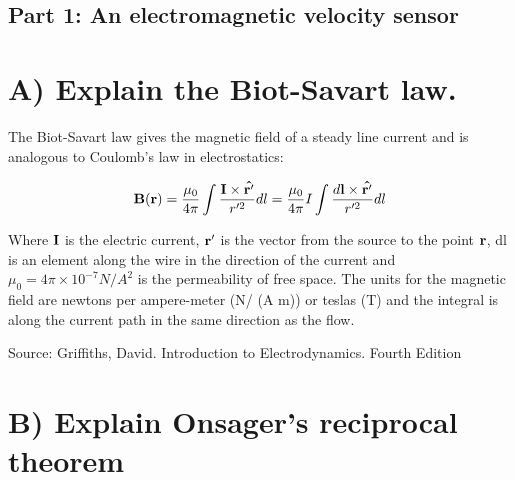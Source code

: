 \documentclass[overlapped,line,letterpaper]{res}
\begin{document}

\setlength{\leftmargini}{0em}
\renewcommand{\labelitemi}{}

\renewcommand{\namefont}{\large\textbf}


\newcommand{\bME}{{\bf T. D. Mikesell}}




\begin{resume}
\vspace{-.4cm}\hspace{-1.3cm}{\bf GEOPH677}
\hspace{11.2cm}{\bf Jan 30 2017}

\subsection{\hspace{-1.3cm}Part 1: An electromagnetic velocity sensor}

\section{A) Explain the Biot-Savart law.}

The Biot-Savart law gives the magnetic field of a steady line current and is analogous to Coulomb's law in electrostatics:

$${\bf B}({\bf r}) = \frac{\mu_0}{4\pi} \int \frac{{\bf I \times \hat{r'} }}{r'^2}dl = \frac{\mu_0}{4\pi}I \int \frac{d{\bf l \times \hat{r'} }}{r'^2}dl$$

Where ${\bf I}$ is the electric current, ${\bf r'}$ is the vector from the source to the point ${\bf r}$, dl is an element along the wire in the direction of the current and $\mu_0 = 4\pi \times 10^{-7} N/A^2$ is the permeability of free space. The units for the magnetic field are newtons per ampere-meter (N/ (A m)) or teslas (T) and the integral is along the current path in the same direction as the flow.
 

Source: Griffiths, David. Introduction to Electrodynamics. Fourth Edition

\section{B) Explain Onsager's reciprocal theorem}


\end{resume}
\end{document}
